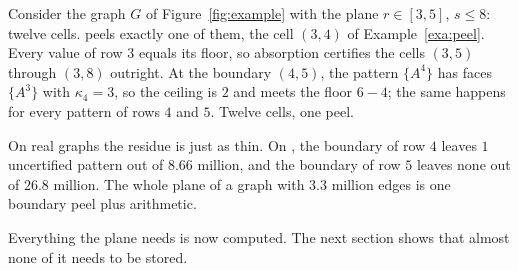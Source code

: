 \begin{example}\label{exa:plane}
Consider the graph $G$ of Figure~\ref{fig:example} with the plane $r\in[3,5]$, $s\le8$: twelve cells.
%
\buildalg{} peels exactly one of them, the cell $(3,4)$ of Example~\ref{exa:peel}.
%
Every value of row $3$ equals its floor, so absorption certifies the cells $(3,5)$ through $(3,8)$ outright.
%
At the boundary $(4,5)$, the pattern $\{A^{4}\}$ has faces $\{A^{3}\}$ with $\kappa_4=3$, so the ceiling is $2$ and meets the floor $6-4$; the same happens for every pattern of rows $4$ and $5$.
%
Twelve cells, one peel.
\end{example}

On real graphs the residue is just as thin.
%
On \pkustk, the boundary of row $4$ leaves $1$ uncertified pattern out of $8.66$ million, and the boundary of row $5$ leaves none out of $26.8$ million.
%
The whole plane of a graph with $3.3$ million edges is one boundary peel plus arithmetic.

Everything the plane needs is now computed.
%
The next section shows that almost none of it needs to be stored.
